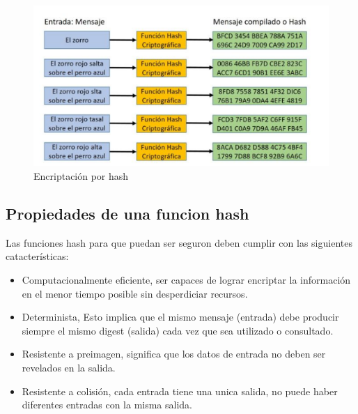 \documentclass[conference]{IEEEtran}
\begin{document}
\begin{figure}[htbp]
    \centering
    \includegraphics[scale=.6]{assets/images/hash.png}
    \caption{Encriptación por hash}
\end{figure}

\subsection{Propiedades de una funcion hash}

Las funciones hash para que puedan ser seguron deben cumplir con las siguientes catacterísticas:

\begin{itemize}
    \item Computacionalmente eficiente, ser capaces de lograr encriptar la información en el menor tiempo posible sin desperdiciar recursos.
    \item Determinista, Esto implica que el mismo mensaje (entrada) debe producir siempre el mismo digest (salida) cada vez que sea utilizado o consultado.
    \item Resistente a preimagen, significa que los datos de entrada no deben ser revelados en la salida.
    \item Resistente a colisión, cada entrada tiene una unica salida, no puede haber diferentes entradas con la misma salida.
\end{itemize}



\end{document}

